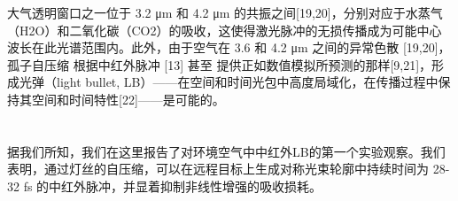 \documentclass[14pt,a4paper,oneside]{article}
\begin{document}
大气透明窗口之一位于 3.2 μm 和 4.2 μm 的共振之间[19,20]，分别对应于水蒸气（H2O）和二氧化碳（CO2）的吸收，这使得激光脉冲的无损传播成为可能中心波长在此光谱范围内。此外，由于空气在 3.6 和 4.2 μm 之间的异常色散 [19,20]，孤子自压缩  根据中红外脉冲 [13] 甚至 提供正如数值模拟所预测的那样[9,21]，形成光弹（light bullet, LB）——在空间和时间光包中高度局域化，在传播过程中保持其空间和时间特性[22]——是可能的。


\section{}



据我们所知，我们在这里报告了对环境空气中中红外LB的第一个实验观察。我们表明，通过灯丝的自压缩，可以在远程目标上生成对称光束轮廓中持续时间为 28-32 fs 的中红外脉冲，并显着抑制非线性增强的吸收损耗。


\newpage

\clearpage           %




\end{document}
